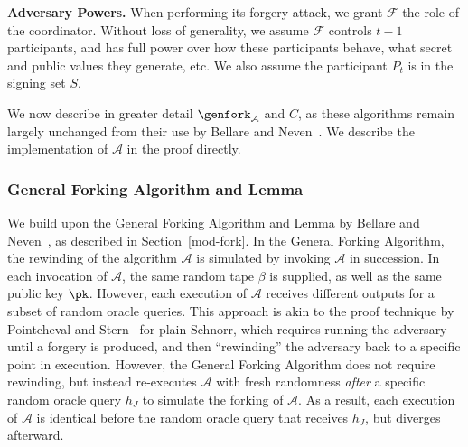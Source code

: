 \textbf{Adversary Powers.}
When performing its forgery attack, we grant $\mathcal{F}$ the role of the coordinator.
Without loss of generality, we assume
$\mathcal{F}$  controls $t-1$ participants, and has full power over how these
participants behave, what secret and public values they generate, etc. We also
assume the participant $P_t$ is in the signing set $S$.

We now
describe in greater detail $\genfork_\mathcal{A}$ and $C$, as
these algorithms remain
largely unchanged from their use by Bellare and
Neven~\cite{BellareN06}.
We describe the implementation of $\mathcal{A}$ in the proof directly.

\subsubsection{General Forking Algorithm and Lemma} \label{gfa}

We build upon the General Forking Algorithm and Lemma by Bellare and
Neven~\cite{BellareN06},
as described in Section~\ref{mod-fork}.
In the General Forking Algorithm, the rewinding of
the algorithm $\mathcal{A}$ is simulated by invoking $\mathcal{A}$ in
succession. In each invocation of $\mathcal{A}$, the same random tape $\beta$
is supplied, as well as the same public key $\pk$. However, each execution of
$\mathcal{A}$ receives different outputs for a subset of random oracle queries.
This approach is akin to the proof technique by  Pointcheval and
Stern~\cite{PointchevalS96} for plain Schnorr,
which requires running the adversary until
a forgery is produced, and then ``rewinding'' the adversary back to a specific
point in execution. However, the General Forking Algorithm does not require
rewinding, but instead re-executes $\mathcal{A}$ with fresh randomness
\emph{after} a specific random oracle query $h_J$ to simulate the forking of
$\mathcal{A}$. As a result, each execution of $\mathcal{A}$ is identical before
the random oracle query that receives $h_J$, but diverges afterward.

